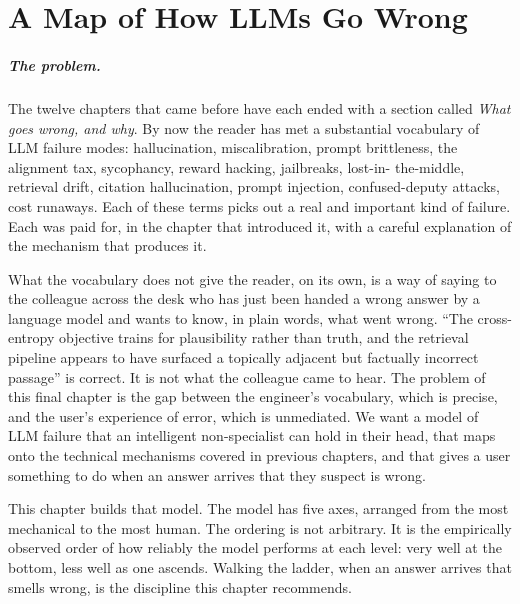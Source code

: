 
\chapter{A Map of How LLMs Go Wrong}
\label{chap:error-model}
\label{ntg:ch13}

\scenelabel
\begin{scenestrip}
\end{scenestrip}

\paragraph{The problem.} The twelve chapters that came before have each ended with a
section called \emph{What goes wrong, and why}. By now the
reader has met a substantial vocabulary of LLM failure modes:
hallucination, miscalibration, prompt brittleness, the
alignment tax, sycophancy, reward hacking, jailbreaks, lost-in-
the-middle, retrieval drift, citation hallucination, prompt
injection, confused-deputy attacks, cost runaways. Each of
these terms picks out a real and important kind of failure.
Each was paid for, in the chapter that introduced it, with a
careful explanation of the mechanism that produces it.

What the vocabulary does not give the reader, on its own, is a
way of saying to the colleague across the desk who has just
been handed a wrong answer by a language model and wants to
know, in plain words, what went wrong. ``The cross-entropy
objective trains for plausibility rather than truth, and the
retrieval pipeline appears to have surfaced a topically
adjacent but factually incorrect passage'' is correct. It is
not what the colleague came to hear. The problem of this final
chapter is the gap between the engineer's vocabulary, which is
precise, and the user's experience of error, which is
unmediated. We want a model of LLM failure that an intelligent
non-specialist can hold in their head, that maps onto the
technical mechanisms covered in previous chapters, and that
gives a user something to do when an answer arrives that they
suspect is wrong.

This chapter builds that model. The model has five axes,
arranged from the most mechanical to the most human. The
ordering is not arbitrary. It is the empirically observed order
of how reliably the model performs at each level: very well at
the bottom, less well as one ascends. Walking the ladder, when
an answer arrives that smells wrong, is the discipline this
chapter recommends.

